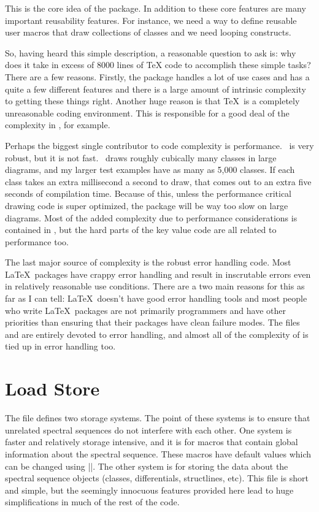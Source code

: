 This is the core idea of the package. In addition to these core features are many important reusability features. For instance, we need a way to define reusable user macros that draw collections of classes and we need looping constructs.

So, having heard this simple description, a reasonable question to ask is: why does it take in excess of 8000 lines of TeX code to accomplish these simple tasks? There are a few reasons. Firstly, the package handles a lot of use cases and has a quite a few different features and there is a large amount of intrinsic complexity to getting these things right. Another huge reason is that \TeX\ is a completely unreasonable coding environment. This is responsible for a good deal of the complexity in , for example.

Perhaps the biggest single contributor to code complexity is performance. \tikzname\ is very robust, but it is not fast. \spectralsequences\ draws roughly cubically many classes in large diagrams, and my larger test examples have as many as 5,000 classes. If each class takes an extra millisecond a second to draw, that comes out to an extra five seconds of compilation time. Because of this, unless the performance critical drawing code is super optimized, the package will be way too slow on large diagrams. Most of the added complexity due to performance considerations is contained in , but the hard parts of the key value code are all related to performance too.

The last major source of complexity is the robust error handling code. Most \LaTeX\ packages have crappy error handling and result in inscrutable errors even in relatively reasonable use conditions. There are a two main reasons for this as far as I can tell: \LaTeX\ doesn't have good error handling tools and most people who write \LaTeX\ packages are not primarily programmers and have other priorities than ensuring that their packages have clean failure modes. The files  and  are entirely devoted to error handling, and almost all of the complexity of  is tied up in error handling too.



\section{Load Store}
The file  defines two storage systems. The point of these systems is to ensure that unrelated spectral sequences do not interfere with each other. One system is faster and relatively storage intensive, and it is for macros that contain global information about the spectral sequence. These macros have default values which can be changed using |\sseqset|. The other system is for storing the data about the spectral sequence objects (classes, differentials, structlines, etc). This file is short and simple, but the seemingly innocuous features provided here lead to huge simplifications in much of the rest of the code.

